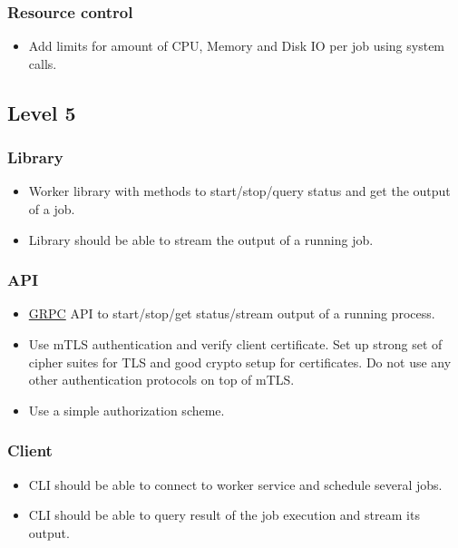 \documentclass{article}
\begin{document}
  \subsubsection*{Resource control}
  \begin{itemize}
  \item[] Add limits for amount of CPU, Memory and Disk IO per job using system calls.
  \end{itemize}

  \subsection*{Level 5}

  \subsubsection*{Library}
  \begin{itemize}
  \item[] Worker library with methods to start/stop/query status and get the output of a job.
  \item[] Library should be able to stream the output of a running job.
  \end{itemize}

  \subsubsection*{API}
  \begin{itemize}
  \item[] \href{https://grpc.io}{GRPC} API to start/stop/get status/stream output of a running process.
  \item[] Use mTLS authentication and verify client certificate. Set up strong set of cipher suites for TLS and good crypto setup for certificates. Do not use any other authentication protocols on top of mTLS.
  \item[] Use a simple authorization scheme.
  \end{itemize}

  \subsubsection*{Client}
  \begin{itemize}
  \item[] CLI should be able to connect to worker service and schedule several jobs.
  \item[] CLI should be able to query result of the job execution and stream its output.
  \end{itemize}
\end{document}
